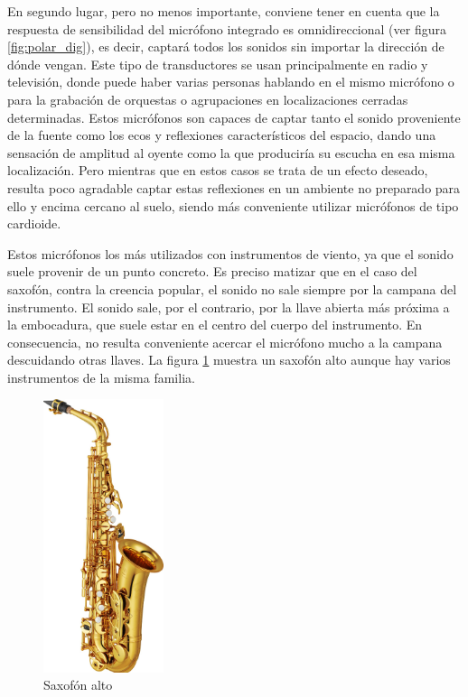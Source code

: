 En segundo lugar, pero no menos importante, conviene tener en cuenta que la respuesta de sensibilidad del micrófono integrado es omnidireccional (ver figura \ref{fig:polar_dig}), es decir, captará todos los sonidos sin importar la dirección de dónde vengan. Este tipo de transductores se usan principalmente en radio y televisión, donde puede haber varias personas hablando en el mismo micrófono o para la grabación de orquestas o agrupaciones en localizaciones cerradas determinadas. Estos micrófonos son capaces de captar tanto el sonido proveniente de la fuente como los ecos y reflexiones característicos del espacio, dando una sensación de amplitud al oyente como la que produciría su escucha en esa misma localización. Pero mientras que en estos casos se trata de un efecto deseado, resulta poco agradable captar estas reflexiones en un ambiente no preparado para ello y encima cercano al suelo, siendo más conveniente utilizar micrófonos de tipo cardioide.

Estos micrófonos los más utilizados con instrumentos de viento, ya que el sonido suele provenir de un punto concreto. Es preciso matizar que en el caso del saxofón, contra la creencia popular, el sonido no sale siempre por la campana del instrumento. El sonido sale, por el contrario, por la llave abierta más próxima a la embocadura, que suele estar en el centro del cuerpo del instrumento. En consecuencia, no resulta conveniente acercar el micrófono mucho a la campana descuidando otras llaves. La figura \ref{fig:saxo} muestra un saxofón alto aunque hay varios instrumentos de la misma familia.

\begin{figure}[!b]
\begin{center}
\includegraphics[height=8cm]{img/saxo.png}
\caption{\label{fig:saxo}Saxofón alto}
\end{center}
\end{figure}

